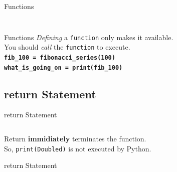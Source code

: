         \begin{frame}{Functions}
            \inputminted[frame=single,framesep=2pt]{python3}{code-examples/function_ex.py}
            \pause
            \inputminted[frame=single,framesep=2pt]{python3}{code-examples/function_ex2.py}
        \end{frame}

        \begin{frame}{Functions}
            \LARGE
            \textit{Defining} a \texttt{function} only makes it available.\\
            \pause 
            You should \textit{call} the \texttt{function} to execute.\\           
            \pause
            \newline
            \textbf{\texttt{fib\_100 = fibonacci\_series(100)}}\\
            \pause
            \textbf{\texttt{what\_is\_going\_on = print(fib\_100)}}\\
            \newline
        \end{frame}

      \subsection{return Statement}

        \begin{frame}{return Statement}
            \LARGE
            \pause
            \inputminted[frame=single,framesep=2pt]{python3}{code-examples/return.py}
            \pause
            Return \textbf{immidiately} terminates the function.\\
            So, \texttt{print(\textquotesingle Doubled\textquotesingle)} is not executed by Python.
        \end{frame}

        \begin{frame}{return Statement}
            \LARGE
            \newline
            \newline
            \newline
        \end{frame}

